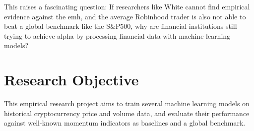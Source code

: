 \clearpage
\noindent
This raises a fascinating question: If researchers like White cannot find empirical evidence against the \gls{emh}, and the average Robinhood trader is also not able to beat a global benchmark like the S\&P500, why are financial institutions still trying to achieve alpha by processing financial data with machine learning models?

\section{Research Objective}
\label{sec:ResearchObjective}
This empirical research project aims to train several machine learning models on historical cryptocurrency price and volume data, and evaluate their performance against well-known momentum indicators as baselines and a global benchmark.